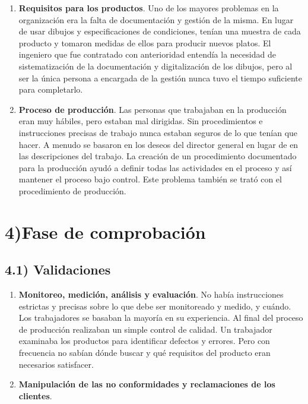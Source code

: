 \documentclass{article} %
\begin{document}
\begin{enumerate}
\item \textbf{ Requisitos para los productos}. Uno de los mayores problemas en la organizaci\'{o}n era la falta de documentaci\'{o}n y gesti\'{o}n de la misma. En lugar de usar dibujos y especificaciones de condiciones, ten\'{i}an una muestra de cada producto y tomaron medidas de ellos para producir nuevos platos. El ingeniero que fue contratado con anterioridad entend\'{i}a la necesidad de sistematizaci\'{o}n de la documentaci\'{o}n y digitalizaci\'{o}n de los dibujos, pero al ser la \'{u}nica persona a encargada de la gesti\'{o}n nunca tuvo el tiempo suficiente para completarlo.

\item  \textbf{Proceso de producci\'{o}n}. Las personas que trabajaban en la producci\'{o}n eran muy h\'{a}biles, pero estaban mal dirigidas. Sin procedimientos e instrucciones precisas de trabajo nunca estaban seguros de lo que ten\'{i}an que hacer. A menudo se basaron en los deseos del director general en lugar de en las descripciones del trabajo. La creaci\'{o}n de un procedimiento documentado para la producci\'{o}n ayud\'{o} a definir todas las actividades en el proceso y as\'{i} mantener el proceso bajo control. Este problema tambi\'{e}n se trat\'{o} con el procedimiento de producci\'{o}n.
\end{enumerate}

\noindent 


\section{4)Fase de comprobaci\'{o}n}


\subsection{       4.1) Validaciones}

\begin{enumerate}
\item  \textbf{Monitoreo, medici\'{o}n, an\'{a}lisis y evaluaci\'{o}n}. No hab\'{i}a instrucciones estrictas y precisas sobre lo que debe ser monitoreado y medido, y cu\'{a}ndo. Los trabajadores se basaban la mayor\'{i}a en su experiencia. Al final del proceso de producci\'{o}n realizaban un simple control de calidad. Un trabajador examinaba los productos para identificar defectos y errores. Pero con frecuencia no sab\'{i}an d\'{o}nde buscar y qu\'{e} requisitos del producto eran necesarios satisfacer.

\item  \textbf{Manipulaci\'{o}n de las no conformidades y reclamaciones de los clientes}. 
\end{enumerate}
\end{document}

